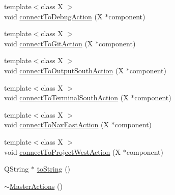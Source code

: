 \begin{DoxyCompactItemize}
\item 
{\footnotesize template$<$class X $>$ }\\void \hyperlink{class_master_actions_a9c1baa889fbb545dc9607044839d5813}{connect\-To\-Debug\-Action} (X $\ast$component)
\item 
{\footnotesize template$<$class X $>$ }\\void \hyperlink{class_master_actions_a6624b38f9a52128e261d78f0313fa99d}{connect\-To\-Git\-Action} (X $\ast$component)
\item 
{\footnotesize template$<$class X $>$ }\\void \hyperlink{class_master_actions_a0ccac38f3166e1410f09f20e27b0d020}{connect\-To\-Output\-South\-Action} (X $\ast$component)
\item 
{\footnotesize template$<$class X $>$ }\\void \hyperlink{class_master_actions_a9f7d8a2bd25c903cbb62be5e9a9ce8fc}{connect\-To\-Terminal\-South\-Action} (X $\ast$component)
\item 
{\footnotesize template$<$class X $>$ }\\void \hyperlink{class_master_actions_ab8028a378675e16f2d9ae4a42a7114be}{connect\-To\-Nav\-East\-Action} (X $\ast$component)
\item 
{\footnotesize template$<$class X $>$ }\\void \hyperlink{class_master_actions_ad8311d5ad31b045095be98a9e29db1bf}{connect\-To\-Project\-West\-Action} (X $\ast$component)
\item 
Q\-String $\ast$ \hyperlink{class_master_actions_ad215eb9ceed2d0cd3552585f3dfa3b62}{to\-String} ()
\item 
\hyperlink{class_master_actions_a2504de3ca736a30530296fc9b44fb55b}{$\sim$\-Master\-Actions} ()
\end{DoxyCompactItemize}
